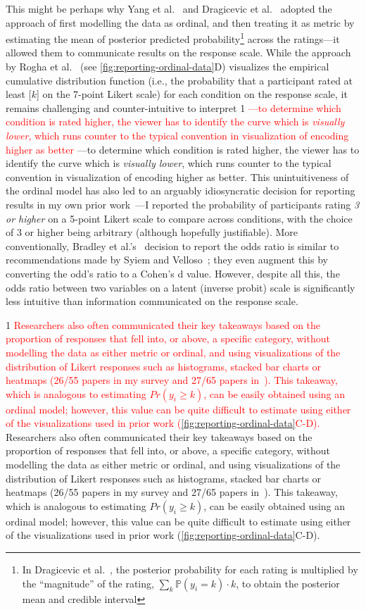 \documentclass{vgtc}                          %
\def\trackchanges{0}
\newcommand{\new}[1]{%
\if\trackchanges1%
\textcolor{red}{#1}%
\else#1\fi}
\begin{document}
This might be perhaps why Yang et al.~\cite{yang_swaying_2024} and Dragicevic et al.~\cite{dragicevic_increasing_2019} adopted the approach of first modelling the data as ordinal, and then treating it as metric by estimating the mean of posterior predicted probability\footnote{In Dragicevic et al.~\cite{dragicevic_increasing_2019}, the posterior probability for each rating is multiplied by the ``magnitude'' of the rating, $\sum_k \mathbb{P}(y_i = k) \cdot k$, to obtain the posterior mean and credible interval} across the ratings---it allowed them to communicate results on the response scale. While the approach by Rogha et al.~\cite{rogha_impact_2024} (see \autoref{fig:reporting-ordinal-data}D) visualizes the empirical cumulative distribution function (i.e., the probability that a participant rated at least [$k$] on the 7-point Likert scale) for each condition on the response scale, it remains challenging and counter-intuitive to interpret\new{---to determine which condition is rated higher, the viewer has to identify the curve which is \textit{visually lower}, which runs counter to the typical convention in visualization  of encoding higher as better}. 
This unintuitiveness of the ordinal model has also led to an arguably idiosyncratic decision for reporting results in my own prior work~\cite{sarma_evaluating_2023}---I reported the probability of participants rating \textit{3 or higher} on a 5-point Likert scale to compare across conditions, with the choice of 3 or higher being arbitrary (although hopefully justifiable). More conventionally, Bradley et al.'s~\cite{bradley_magnitude_2025} decision to report the odds ratio is similar to recommendations made by Syiem and Velloso~\cite{victorsyiem_better_2026}; they even augment this by converting the odd's ratio to a Cohen's d value. However, despite all this, the odds ratio between two variables on a latent (inverse probit) scale is significantly less intuitive than information communicated on the response scale.

\new{Researchers also often communicated their key takeaways based on the proportion of responses that fell into, or above, a specific category, without modelling the data as either metric or ordinal, and using visualizations of the distribution of Likert responses such as histograms, stacked bar charts or heatmaps (26/55 papers in my survey and 27/65 papers in~\cite{south_effective_2022}). This takeaway, which is analogous to estimating $Pr(y_i \geq k)$, can be easily obtained using an ordinal model; however, this value can be quite difficult to estimate using either of the visualizations used in prior work (\autoref{fig:reporting-ordinal-data}C-D).}
\end{document}
